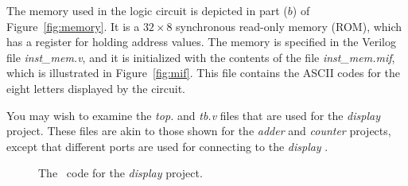 {The memory used in the logic circuit is depicted in part ($b$) of Figure~\ref{fig:memory}. It
is a $32 \times 8$ synchronous read-only memory (ROM), which has a register for holding 
address values. The memory is specified in the Verilog file {\it inst\_mem.v}, and it is 
initialized with the contents of the file {\it inst\_mem.mif},
which is illustrated in Figure~\ref{fig:mif}. This file contains the ASCII codes for the 
eight letters displayed by the circuit.

You may wish to examine the {\it top.\hdlFileExt} and {\it tb.v} files that are 
used for the {\it display} project.  These files are akin to those shown for the 
{\it adder} and {\it counter} projects, except that different ports are used for 
connecting to the {\it display} \hdlModuleName. 

\begin{figure}[h]
\begin{center}
\begin{minipage}[h]{15 cm}
\ifverilog
	\ifnotSV
        
    \else
        
    \fi
\else
	
\fi
\end{minipage}
	\caption{The \hdlName~code for the {\it display} project\ifverilog{}\fi.}
	\label{fig:display}
\end{center}
\end{figure}

\ifverilog
{}
\else
    \begin{center}
    \begin{minipage}[h]{15 cm}
	    
    \end{minipage}
    \end{center}
\fi

}
